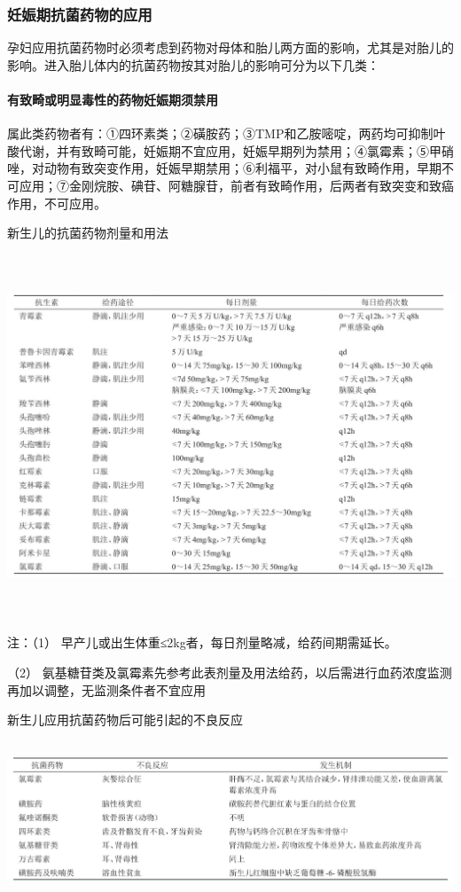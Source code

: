 \subsubsection{妊娠期抗菌药物的应用}

孕妇应用抗菌药物时必须考虑到药物对母体和胎儿两方面的影响，尤其是对胎儿的影响。进入胎儿体内的抗菌药物按其对胎儿的影响可分为以下几类：

\paragraph{有致畸或明显毒性的药物妊娠期须禁用}

属此类药物者有：①四环素类；②磺胺药；③TMP和乙胺嘧啶，两药均可抑制叶酸代谢，并有致畸可能，妊娠期不宜应用，妊娠早期列为禁用；④氯霉素；⑤甲硝唑，对动物有致突变作用，妊娠早期禁用；⑥利福平，对小鼠有致畸作用，早期不可应用；⑦金刚烷胺、碘苷、阿糖腺苷，前者有致畸作用，后两者有致突变和致癌作用，不可应用。

\begin{table}[htbp]
{\centering
\caption{新生儿的抗菌药物剂量和用法}
\label{tab154-7}
\includegraphics[width=6.70833in,height=4.27083in]{./images/Image00595.jpg}}

{\small 
注：（1） 早产儿或出生体重≤2kg者，每日剂量略减，给药间期需延长。

（2）
氨基糖苷类及氯霉素先参考此表剂量及用法给药，以后需进行血药浓度监测再加以调整，无监测条件者不宜应用
}
\end{table}


\begin{table}[htbp]
\centering
\caption{新生儿应用抗菌药物后可能引起的不良反应}
\label{tab154-8}
\includegraphics[width=6.63542in,height=1.88542in]{./images/Image00596.jpg}
\end{table}

